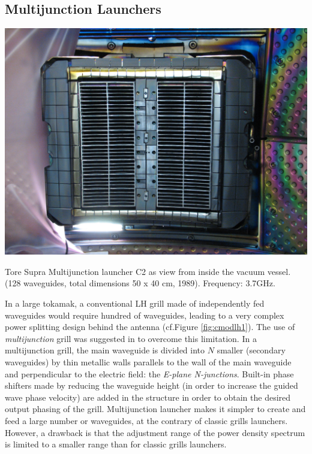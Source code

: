 \subsection{Multijunction Launchers}\label{sec:multijunction}
\begin{marginfigure}
	\centering
	\includegraphics[width=0.9\linewidth]{figures/chap3/ToreSupra_C2}
	\caption{Tore Supra Multijunction launcher C2 as view from inside the vacuum vessel. (128 waveguides, total dimensions 50 x 40 cm, 1989). Frequency: 3.7GHz.}
	\label{fig:toresupraC2}
\end{marginfigure}
In a large tokamak, a conventional LH grill made of independently fed waveguides would require hundred of waveguides, leading to a very complex power splitting design behind the antenna (cf.Figure \ref{fig:cmodlh1}). The use of \emph{multijunction} grill was suggested in  to overcome this limitation. In a multijunction grill, the main waveguide is divided into $N$ smaller (secondary waveguides) by thin metallic walls parallels to the wall of the main waveguide and perpendicular to the electric field: the \emph{E-plane N-junctions}. Built-in phase shifters made by reducing the waveguide height (in order to increase the guided wave phase velocity) are added in the structure in order to obtain the desired output phasing of the grill. Multijunction launcher makes it simpler to create and feed a large number or waveguides, at the contrary of classic grills launchers. However, a drawback is that the adjustment range of the power density spectrum is limited to a smaller range than for classic grills launchers.

